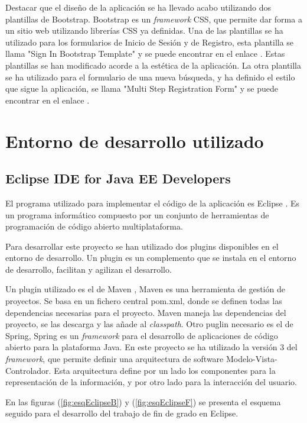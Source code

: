 Destacar que el diseño de la aplicación se ha llevado acabo utilizando dos plantillas de Bootstrap. Bootstrap es un \textit{framework} CSS, que permite dar forma a un sitio web utilizando librerías CSS ya definidas. Una de las plantillas se ha utilizado para los formularios de Inicio de Sesión y de Registro, esta plantilla se llama  "Sign In Bootstrap Template" y se puede encontrar en el enlace \cite{login}. Estas plantillas se han modificado acorde a la estética de la aplicación. La otra plantilla se ha utilizado para el formulario de una nueva búsqueda, y ha definido el estilo que sigue la aplicación, se llama "Multi Step Registration Form" y se puede encontrar en el enlace \cite{step}. 
\section{Entorno de desarrollo utilizado}

\subsection{Eclipse IDE for Java EE Developers}

El programa utilizado para implementar el código de la aplicación es Eclipse \cite{3}. Es un programa informático compuesto por un conjunto de herramientas de programación de código abierto multiplataforma. 

Para desarrollar este proyecto se han utilizado dos plugins disponibles en el entorno de desarrollo. Un plugin es un complemento que se instala en el entorno de desarrollo, facilitan y agilizan el desarrollo.

Un plugin utilizado es el de Maven \cite{3}, Maven es una herramienta de gestión de proyectos. Se basa en un fichero central pom.xml, donde se definen todas las dependencias necesarias para el proyecto. Maven maneja las dependencias del proyecto, se las descarga y las añade al \textit{classpath}. Otro puglin necesario es el de Spring, Spring es un \textit{framework} para el desarrollo de aplicaciones de código abierto para la plataforma Java. En este proyecto se ha utilizado la versión 3 del \textit{framework}, que permite definir una arquitectura de software Modelo-Vista-Controlador. Esta arquitectura define por un lado los componentes para la representación de la información, y por otro lado para la interacción del usuario.

En las figuras (\ref{fig:esqEclipseB}) y (\ref{fig:esqEclipseF}) se presenta el esquema seguido para el desarrollo del trabajo de fin de grado en Eclipse. 


